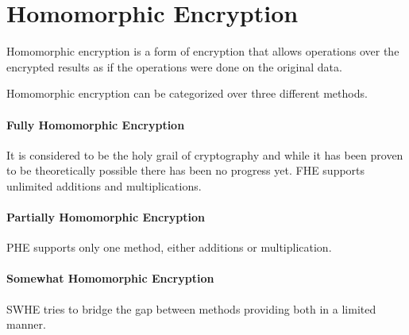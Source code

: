 \section{Homomorphic Encryption}

Homomorphic encryption is a form of encryption that allows operations over the encrypted results
as if the operations were done on the original data.

Homomorphic encryption can be categorized over three different methods.

\paragraph{Fully Homomorphic Encryption}
It is considered to be the holy grail of cryptography and while it has been proven to be theoretically possible there has been no progress yet.
FHE supports unlimited additions and multiplications.

\paragraph{Partially Homomorphic Encryption}
PHE supports only one method, either additions or multiplication.

\paragraph{Somewhat Homomorphic Encryption}
SWHE tries to bridge the gap between methods providing both in a limited manner.